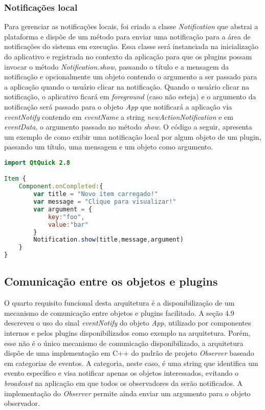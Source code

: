 \subsubsection{Notificações local}
Para gerenciar as notificações locais, foi criado a classe \textit{Notification} que abstrai a plataforma e dispõe de um método para enviar uma notificação para a área de notificações do sistema em execução. Essa classe será instanciada na inicialização do aplicativo e registrada no contexto da aplicação para que os plugins possam invocar o método \textit{Notification.show}, passando o título e a mensagem da notificação e opcionalmente um objeto contendo o argumento a ser passado para a aplicação quando o usuário clicar na notificação. Quando o usuário clicar na notificação, o aplicativo ficará em \textit{foreground} (caso não esteja) e o argumento da notificação será passado para o objeto \textit{App} que notificará a aplicação via \textit{eventNotify} contendo em \textit{eventName} a string \textit{newActionNotification} e em \textit{eventData}, o argumento passado no método \textit{show}. O código a seguir, apresenta um exemplo de como exibir uma notificação local por algum objeto de um plugin, passando um título, uma mensagem e um objeto como argumento.

\begin{center}
\begin{lstlisting}[language=qml]
import QtQuick 2.8

Item {
    Component.onCompleted:{
		var title = "Novo item carregado!"
		var message = "Clique para visualizar!"
		var argument = {
			key:"foo",
			value:"bar"
		}
		Notification.show(title,message,argument)
	}
}
\end{lstlisting}
\end{center}


\subsection{Comunicação entre os objetos e plugins}
O quarto requisito funcional desta arquitetura é a disponibilização de um mecanismo de comunicação entre objetos e plugins facilitado. A seção 4.9 descreveu o uso do sinal \textit{eventNotify} do objeto \textit{App}, utilizado por componentes internos e pelos plugins disponibilizados como exemplo na arquitetura. Porém, esse não é o único mecanismo de comunicação disponibilizado, a arquitetura dispõe de uma implementação em C++ do padrão de projeto \textit{Observer} baseado em categorias de eventos. A categoria, neste caso, é uma string que identifica um evento específico e visa notificar apenas os objetos interessados, evitando o \textit{broadcast} na aplicação em que todos os observadores da serão notificados. A implementação do \textit{Observer} permite ainda enviar um argumento para o objeto observador.\par

